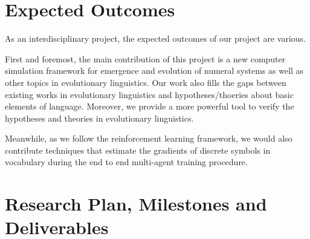 \documentclass[a4paper,11pt]{article}
\begin{document}
\section{Expected Outcomes}
\label{sec:5outcomes}

As an interdisciplinary project, the expected outcomes of our project are various.

First and foremost, the main contribution of this project is a new computer simulation framework for emergence and evolution of numeral systems as well as other topics in evolutionary linguistics. Our work also fills the gaps between existing works in evolutionary linguistics and hypotheses/thoeries about basic elements of language. Moreover, we provide a more powerful tool to verify the hypotheses and theories in evolutionary linguistics.

Meanwhile, as we follow the reinforcement learning framework, we would also contribute techniques that estimate the gradients of discrete symbols in vocabulary during the end to end multi-agent training procedure.

%


\section{Research Plan, Milestones and Deliverables}
\label{sec:6plan}

\end{document}
